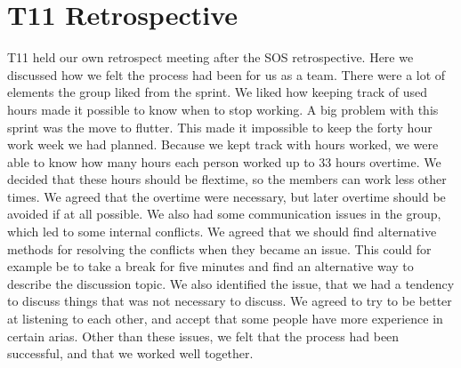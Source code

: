 \section{T11 Retrospective} \label{s1Retrospective}
\gls{T11} held our own retrospect meeting after the SOS retrospective. 
Here we discussed how we felt the process had been for us as a team. 
There were a lot of elements the group liked from the sprint. 
We liked how keeping track of used hours made it possible to know when to stop working. 
A big problem with this sprint was the move to flutter. This made it impossible to keep the forty hour work week we had planned. 
Because we kept track with hours worked, we were able to know how many hours each person worked up to 33 hours overtime. We decided that these hours should be flextime, so the members can work less other times. 
We agreed that the overtime were necessary, but later overtime should be avoided if at all possible.
We also had some communication issues in the group, which led to some internal conflicts. We agreed that we should find alternative methods for resolving the conflicts when they became an issue. This could for example be to take a break for five minutes and find an alternative way to describe the discussion topic. 
We also identified the issue, that we had a tendency to discuss things that was not necessary to discuss. We agreed to try to be better at listening to each other, and accept that some people have more experience in certain arias. 
Other than these issues, we felt that the process had been successful, and that we worked well together.
